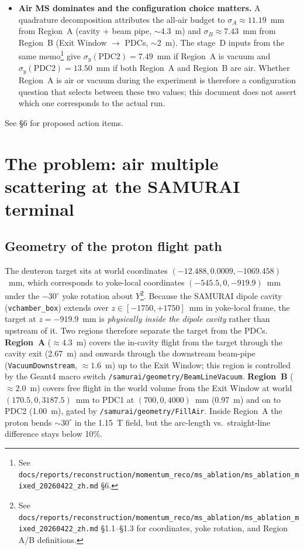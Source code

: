 \documentclass[a4paper, 11pt]{article}
\begin{document}
\begin{itemize}
  \item \textbf{Air MS dominates and the configuration choice matters.} A quadrature decomposition attributes the all-air budget to $\sigma_A \approx 11.19$~mm from Region~A (cavity + beam pipe, $\sim$4.3~m) and $\sigma_B \approx 7.43$~mm from Region~B (Exit Window $\to$ PDCs, $\sim$2~m). The stage~D inputs from the same memo\footnote{See \texttt{docs/reports/reconstruction/momentum\_reco/ms\_ablation/ms\_ablation\_mixed\_20260422\_zh.md} §6.} give $\sigma_y(\text{PDC2}) = 7.49$~mm if Region~A is vacuum and $\sigma_y(\text{PDC2}) = 13.50$~mm if both Region~A and Region~B are air. Whether Region~A is air or vacuum during the experiment is therefore a configuration question that selects between these two values; this document does not assert which one corresponds to the actual run.
\end{itemize}

See §6 for proposed action items.

\section{The problem: air multiple scattering at the SAMURAI terminal}

\subsection{Geometry of the proton flight path}
The deuteron target sits at world coordinates $(-12.488, 0.0009, -1069.458)$~mm, which corresponds to yoke-local coordinates $(-545.5, 0, -919.9)$~mm under the $-30^\circ$ yoke rotation about $Y$\footnote{\label{fn:msablation_geom}See \texttt{docs/reports/reconstruction/momentum\_reco/ms\_ablation/ms\_ablation\_mixed\_20260422\_zh.md} §1.1--§1.3 for coordinates, yoke rotation, and Region A/B definitions.}. Because the SAMURAI dipole cavity (\texttt{vchamber\_box}) extends over $z \in [-1750, +1750]$~mm in yoke-local frame, the target at $z=-919.9$~mm is \emph{physically inside the dipole cavity} rather than upstream of it. Two regions therefore separate the target from the PDCs. \textbf{Region~A} ($\approx 4.3$~m) covers the in-cavity flight from the target through the cavity exit (2.67~m) and onwards through the downstream beam-pipe (\texttt{VacuumDownstream}, $\approx 1.6$~m) up to the Exit Window; this region is controlled by the Geant4 macro switch \texttt{/samurai/geometry/BeamLineVacuum}. \textbf{Region~B} ($\approx 2.0$~m) covers free flight in the world volume from the Exit Window at world $(170.5, 0, 3187.5)$~mm to PDC1 at $(700, 0, 4000)$~mm (0.97~m) and on to PDC2 (1.00~m), gated by \texttt{/samurai/geometry/FillAir}. Inside Region~A the proton bends $\sim 30^\circ$ in the 1.15~T field, but the arc-length vs.\ straight-line difference stays below 10\%.
\end{document}
